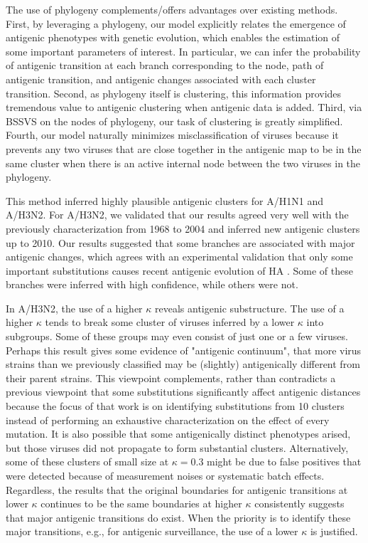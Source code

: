 \documentclass[11pt,oneside,letterpaper]{article}
\begin{document}
The use of phylogeny complements/offers advantages over existing methods. 
First, by leveraging a phylogeny, our model explicitly relates the emergence of antigenic phenotypes with genetic evolution, which enables the estimation of some important parameters of interest. 
In particular, we can infer the probability of antigenic transition at each branch corresponding to the node, path of antigenic transition, and antigenic changes associated with each cluster transition. 
Second, as phylogeny itself is clustering, this information provides tremendous value to antigenic clustering when antigenic data is added. 
Third, via BSSVS on the nodes of phylogeny, our task of clustering is greatly simplified. 
Fourth, our model naturally minimizes misclassification of viruses because it prevents any two viruses that are close together in the antigenic map to be in the same cluster when there is an active internal node between the two viruses in the phylogeny.

This method inferred highly plausible antigenic clusters for A/H1N1 and A/H3N2. 
For  A/H3N2, we validated that our results agreed very well with the previously characterization from 1968 to 2004 \cite{smith_mapping_2004} and inferred new antigenic clusters up to 2010. 
Our results suggested that some branches are associated with major antigenic changes, which agrees with an experimental validation that only some important substitutions causes recent antigenic evolution of HA \cite{koel_substitutions_2013}. 
Some of these branches were inferred with high confidence, while others were not. 


In A/H3N2, the use of a higher $\kappa$ reveals antigenic substructure. 
The use of a higher $\kappa$ tends to break some cluster of viruses inferred by a lower $\kappa$ into subgroups. 
Some of these groups may even consist of just one or a few viruses. 
Perhaps this result gives some evidence of "antigenic continuum", that more virus strains than we previously classified may be (slightly) antigenically different from their parent strains. 
This viewpoint complements, rather than contradicts a previous viewpoint that some substitutions significantly affect antigenic distances \cite{koel_substitutions_2013} because the focus of that work is on identifying substitutions from 10 clusters instead of performing an exhaustive characterization on the effect of every mutation. 
It is also possible that some antigenically distinct phenotypes arised, but those viruses did not propagate to form substantial clusters.
Alternatively, some of these clusters of small size at $\kappa=0.3$ might be due to false positives that were detected because of measurement noises or systematic batch effects.
Regardless, the results that the original boundaries for antigenic transitions at lower $\kappa$ continues to be the same boundaries at higher $\kappa$ consistently suggests that major antigenic transitions do exist. 
When the priority is to identify these major transitions, e.g., for antigenic surveillance, the use of a lower $\kappa$ is justified.  
\end{document}
